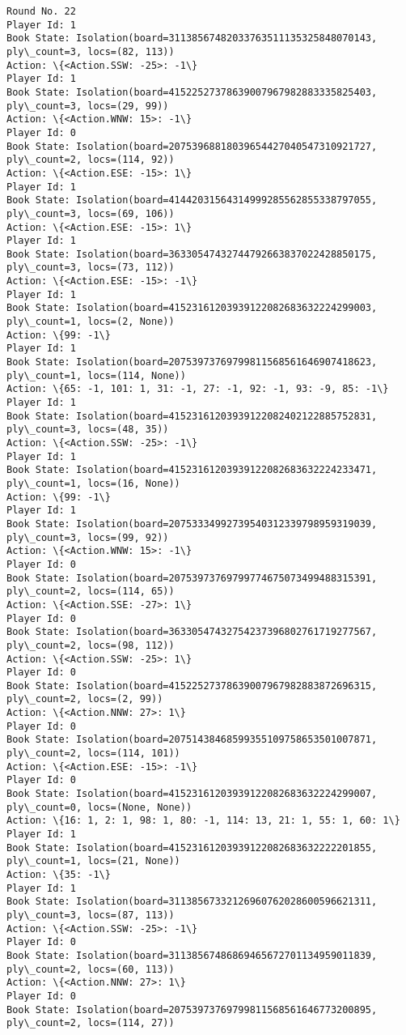 \documentclass[11pt]{article}
\begin{document}
\begin{Verbatim}[commandchars=\\\{\}]
Round No. 22
Player Id: 1
Book State: Isolation(board=31138567482033763511135325848070143, ply\_count=3, locs=(82, 113))
Action: \{<Action.SSW: -25>: -1\}
Player Id: 1
Book State: Isolation(board=41522527378639007967982883335825403, ply\_count=3, locs=(29, 99))
Action: \{<Action.WNW: 15>: -1\}
Player Id: 0
Book State: Isolation(board=20753968818039654427040547310921727, ply\_count=2, locs=(114, 92))
Action: \{<Action.ESE: -15>: 1\}
Player Id: 1
Book State: Isolation(board=41442031564314999285562855338797055, ply\_count=3, locs=(69, 106))
Action: \{<Action.ESE: -15>: 1\}
Player Id: 1
Book State: Isolation(board=36330547432744792663837022428850175, ply\_count=3, locs=(73, 112))
Action: \{<Action.ESE: -15>: -1\}
Player Id: 1
Book State: Isolation(board=41523161203939122082683632224299003, ply\_count=1, locs=(2, None))
Action: \{99: -1\}
Player Id: 1
Book State: Isolation(board=20753973769799811568561646907418623, ply\_count=1, locs=(114, None))
Action: \{65: -1, 101: 1, 31: -1, 27: -1, 92: -1, 93: -9, 85: -1\}
Player Id: 1
Book State: Isolation(board=41523161203939122082402122885752831, ply\_count=3, locs=(48, 35))
Action: \{<Action.SSW: -25>: -1\}
Player Id: 1
Book State: Isolation(board=41523161203939122082683632224233471, ply\_count=1, locs=(16, None))
Action: \{99: -1\}
Player Id: 1
Book State: Isolation(board=20753334992739540312339798959319039, ply\_count=3, locs=(99, 92))
Action: \{<Action.WNW: 15>: -1\}
Player Id: 0
Book State: Isolation(board=20753973769799774675073499488315391, ply\_count=2, locs=(114, 65))
Action: \{<Action.SSE: -27>: 1\}
Player Id: 0
Book State: Isolation(board=36330547432754237396802761719277567, ply\_count=2, locs=(98, 112))
Action: \{<Action.SSW: -25>: 1\}
Player Id: 0
Book State: Isolation(board=41522527378639007967982883872696315, ply\_count=2, locs=(2, 99))
Action: \{<Action.NNW: 27>: 1\}
Player Id: 0
Book State: Isolation(board=20751438468599355109758653501007871, ply\_count=2, locs=(114, 101))
Action: \{<Action.ESE: -15>: -1\}
Player Id: 0
Book State: Isolation(board=41523161203939122082683632224299007, ply\_count=0, locs=(None, None))
Action: \{16: 1, 2: 1, 98: 1, 80: -1, 114: 13, 21: 1, 55: 1, 60: 1\}
Player Id: 1
Book State: Isolation(board=41523161203939122082683632222201855, ply\_count=1, locs=(21, None))
Action: \{35: -1\}
Player Id: 1
Book State: Isolation(board=31138567332126960762028600596621311, ply\_count=3, locs=(87, 113))
Action: \{<Action.SSW: -25>: -1\}
Player Id: 0
Book State: Isolation(board=31138567486869465672701134959011839, ply\_count=2, locs=(60, 113))
Action: \{<Action.NNW: 27>: 1\}
Player Id: 0
Book State: Isolation(board=20753973769799811568561646773200895, ply\_count=2, locs=(114, 27))

\end{Verbatim}
\end{document}
